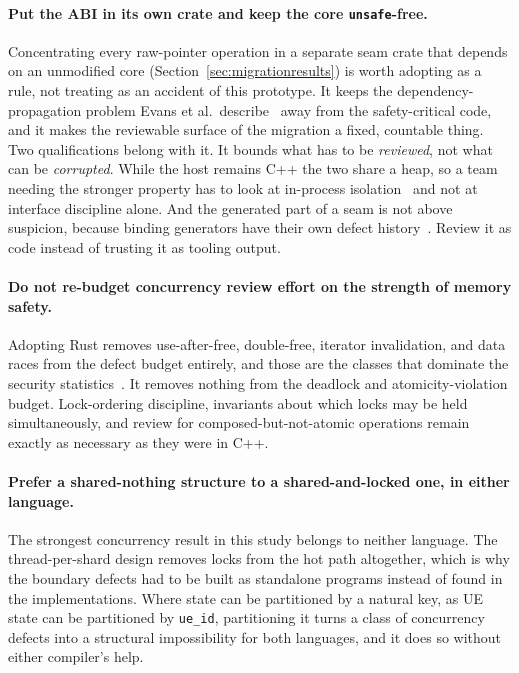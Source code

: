\documentclass[english,oneside,a4paper,censored,csm,software-track-2020]{HYthesisML}
\begin{document}
\begin{appendices}
\paragraph{Put the ABI in its own crate and keep the core \texttt{unsafe}-free.}
Concentrating every raw-pointer operation in a separate seam crate that depends on an unmodified
core (Section~\ref{sec:migrationresults}) is worth adopting as a rule, not treating as an
accident of this prototype. It keeps the dependency-propagation problem Evans et al.\
describe~\cite{evans2020rust} away from the safety-critical code, and it makes the reviewable
surface of the migration a fixed, countable thing. Two qualifications belong with it. It
bounds what has to be \emph{reviewed}, not what can be \emph{corrupted}. While the host remains
C++ the two share a heap, so a team needing the stronger property has to look at in-process
isolation~\cite{rivera2021galeed,kirth2022pkrusafe} and not at interface discipline alone. And
the generated part of a seam is not above suspicion, because binding generators have their own
defect history~\cite{cai2026interop}. Review it as code instead of trusting it as tooling output.

\paragraph{Do not re-budget concurrency review effort on the strength of memory safety.}
Adopting Rust removes use-after-free, double-free, iterator invalidation, and data races from
the defect budget entirely, and those are the classes that dominate the security
statistics~\cite{msrc2019memory,google2022android}. It removes nothing from the deadlock and
atomicity-violation budget. Lock-ordering discipline, invariants about which locks may be held
simultaneously, and review for composed-but-not-atomic operations remain exactly as necessary as
they were in C++.

\paragraph{Prefer a shared-nothing structure to a shared-and-locked one, in either language.}
The strongest concurrency result in this study belongs to neither language. The
thread-per-shard design removes locks from the hot path altogether, which is why the boundary
defects had to be built as standalone programs instead of found in the implementations. Where
state can be partitioned by a natural key, as UE state can be partitioned by \texttt{ue\_id},
partitioning it turns a class of concurrency defects into a structural impossibility for both
languages, and it does so without either compiler's help.


\end{appendices}
\end{document}
